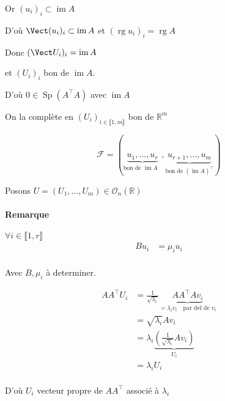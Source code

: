 \documentclass{article}
\newcommand{\Sp}{\operatorname{Sp}}
\newcommand{\image}{\operatorname{im}}
\newcommand{\rg}{\operatorname{rg}}
\newcommand{\cF}{\mathcal{F}}
\newcommand{\cO}{\mathcal{O}}
\newcommand{\R}{\mathbb{R}}
\begin{document}
\begin{itemize}
		Or $(u_i)_i \subset \image A$

		D'où $\Vect(u_i)_i \subset  \image A$ et $(\rg u_i)_i = \rg A$

		Donc  $(\Vect U_i)_i = \image A$ 

		 et $(U_i)_i$ bon de $\image A$.

		 D'où  $0\in \Sp(A^\top A)$ avec $\image A$

		 On la complète en  $(U_i)_{i\in \llbracket 1, m\rrbracket}$ bon de $\R^m$

		 \[
			 \cF = \left( \underbrace{u_1, \ldots, u_{r}}_{\text{bon de $\image A$ }}, \underbrace{u_{r+1}, \ldots, u_m}_\text{bon de $(\image A)^\top$} \right) 
		 \] 

		 Posons $U = (U_1, \ldots, U_m) \in \cO_n(\R)$

		 \paragraph{Remarque}
		 $\forall i\in \llbracket 1, r \rrbracket$
		 \begin{align*}
			 B u_i &= \mu_i u_i \\
		 \end{align*}


		 Avec $B, \mu_i$ à determiner.

		  \begin{align*}
			  A A ^\top U_i &= \frac{1}{\sqrt{\lambda_i} } \underbrace{A A^\top A v_i}_{=\lambda_i v_i\quad \text{par def de $v_i$}} \\
			  &= \sqrt{\lambda_i} A v_i  \\
			  &= \lambda_i \underbrace{\left( \frac{1}{\sqrt{\lambda_i} } A v_i \right) }_{U_i} \\
			  &= \lambda_i U_i \\
		 \end{align*}


		 D'où $U_i$ vecteur propre de $A A^\top$ associé à  $\lambda_i$


\end{itemize}
\end{document}
